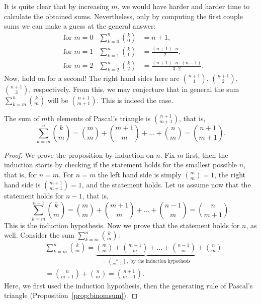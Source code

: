 It is quite clear that by increasing $m$, we would have harder and harder time to calculate the obtained sums. 
Nevertheless, only by computing the first couple sums we can make a guess at the general answer: 
\begin{align*}
& \text{for $m=0$} & \sum_{k=0}^n \binom{k}{0} &= n+1, \\
& \text{for $m=1$} & \sum_{k=1}^n \binom{k}{1} &= \frac{(n+1) \cdot n}{2}, \\
& \text{for $m=2$} & \sum_{k=2}^n \binom{k}{2} &= \frac{(n+1) \cdot n \cdot (n-1)}{3 \cdot 2}. 
\end{align*}
Now, hold on for a second! 
The right hand sides here are $\binom{n+1}{1}$, $\binom{n+1}{2}$, $\binom{n+1}{3}$, respectively. 
From this, we may conjecture that in general the sum $\sum_{k=m}^n \binom{k}{m}$ will be $\binom{n+1}{m+1}$. 
This is indeed the case. 
\begin{proposition}\label{prop:sumkchoosem}
The sum of $m$th elements of Pascal's triangle is $\binom{n+1}{m+1}$, that is, 
\begin{equation}\label{eq:sumkchoosem}
\sum_{k=m}^n \binom{k}{m} = \binom{m}{m} + \binom{m+1}{m} + \dots + \binom{n}{m} = \binom{n+1}{m+1}. 
\end{equation}
\end{proposition}

\begin{proof}
We prove the proposition by induction on $n$. 
Fix $m$ first, 
then the induction starts by checking if the statement holds for the smallest possible $n$, that is, for $n = m$. 
For $n=m$ the left hand side is simply $\binom{m}{m} = 1$, 
the right hand side is $\binom{m+1}{m+1} = 1$, 
and the statement holds. 
Let us assume now that the statement holds for $n-1$, 
that is, 
\[
\sum_{k=m}^{n-1} \binom{k}{m} = \binom{m}{m} + \binom{m+1}{m} + \dots + \binom{n-1}{m} = \binom{n}{m+1}. 
\]
This is the induction hypothesis. 
Now we prove that the statement holds for $n$, as well. 
Consider the sum $\sum_{k=m}^{n} \binom{k}{m}$: 
\begin{align*}
& \sum_{k=m}^{n} \binom{k}{m} = \underbrace{\binom{m}{m} + \binom{m+1}{m} + \dots + \binom{n-1}{m}}_{= \binom{n}{m+1}, \text{ by the induction hypothesis}} + \binom{n}{m} \\
&= \binom{n}{m+1} + \binom{n}{m} = \binom{n+1}{m+1}. 
\end{align*}
Here, we first used the induction hypothesis, 
then the generating rule of Pascal's triangle (Proposition~\ref{prop:binomsum}). 
\end{proof}

